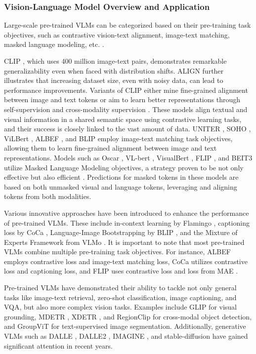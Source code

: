 \documentclass[journal]{IEEEtran}
\begin{document}
\subsubsection{Vision-Language Model Overview and Application} 

Large-scale pre-trained VLMs can be categorized based on their pre-training task objectives, such as contrastive vision-text alignment, image-text matching, masked language modeling, etc. \cite{du2022survey}.

CLIP \cite{clip}, which uses 400 million image-text pairs, demonstrates remarkable generalizability even when faced with distribution shifts. ALIGN \cite{align} further illustrates that increasing dataset size, even with noisy data, can lead to performance improvements. Variants of CLIP either mine fine-grained alignment between image and text tokens \cite{filip} or aim to learn better representations through self-supervision \cite{slip} and cross-modality supervision \cite{declip}. These models align textual and visual information in a shared semantic space using contrastive learning tasks, and their success is closely linked to the vast amount of data. UNITER \cite{uniter}, SOHO \cite{soho}, ViLBert \cite{vilbert}, ALBEF \cite{albef}, and BLIP \cite{blip} employ image-text matching task objectives, allowing them to learn fine-grained alignment between image and text representations. Models such as Oscar \cite{oscar}, VL-bert \cite{vlbert}, VisualBert \cite{visualbert}, FLIP \cite{flip}, and BEIT3 \cite{beit3} utilize Masked Language Modeling objectives, a strategy proven to be not only effective but also efficient \cite{flip}. Predictions for masked tokens in these models are based on both unmasked visual and language tokens, leveraging and aligning tokens from both modalities.

Various innovative approaches have been introduced to enhance the performance of pre-trained VLMs. These include in-context learning by Flamingo \cite{flamingo}, captioning loss by CoCa \cite{coca}, Language-Image Bootstrapping by BLIP \cite{blip}, and the Mixture of Experts Framework from VLMo \cite{vlmo}. It is important to note that most pre-trained VLMs combine multiple pre-training task objectives. For instance, ALBEF \cite{albef} employs contrastive loss and image-text matching loss, CoCa \cite{coca} utilizes contrastive loss and captioning loss, and FLIP \cite{flip} uses contrastive loss and loss from MAE \cite{mae}.

Pre-trained VLMs have demonstrated their ability to tackle not only general tasks like image-text retrieval, zero-shot classification, image captioning, and VQA, but also more complex vision tasks. Examples include GLIP \cite{glip} for visual grounding, MDETR \cite{mdetr}, XDETR \cite{xdetr}, and RegionClip \cite{regionclip} for cross-modal object detection, and GroupViT \cite{groupvit} for text-supervised image segmentation. Additionally, generative VLMs such as DALLE \cite{dalle}, DALLE2 \cite{dalle2}, IMAGINE \cite{imagine}, and stable-diffusion \cite{stable-diffusion} have gained significant attention in recent years.
\end{document}
